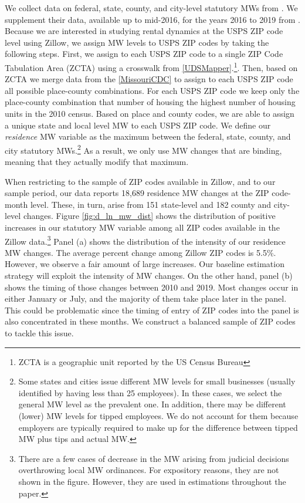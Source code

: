 We collect data on federal, state, county, and city-level statutory MWs from 
\textcite{VaghulZipperer2016}. We supplement their data, available up to mid-2016, 
for the years 2016 to 2019 from \textcite{BerkeleyLaborCenter}. 
Because we are interested in studying rental dynamics at the USPS ZIP code level using Zillow, 
we assign MW levels to USPS ZIP codes by taking the following steps. First, we assign to each USPS 
ZIP code to a single ZIP Code Tabulation Area (ZCTA) using a crosswalk from \ref{UDSMapper}.\footnote{
	ZCTA is a geographic unit reported by the US Census Bureau}. 
Then, based on ZCTA we merge data from the \ref{MissouriCDC} to assign to each USPS ZIP code 
all possible place-county combinations. For each USPS ZIP code we keep only the place-county 
combination that number of housing the highest number of housing units in the 2010 census. 
Based on place and county codes, we are able to assign a unique state and local level MW to each 
USPS ZIP code. We define our \textit{residence} MW variable as the maximum between the 
federal, state, county, and city statutory MWs.\footnote{Some states 
	and cities issue different MW levels for small businesses (usually identified by having 
	less than 25 employees). In these cases, we select the general MW level as the prevalent 
	one. In addition, there may be different (lower) MW levels for tipped employees. We do not 
	account for them because employers are typically required to make up for the difference 
	between tipped MW plus tips and actual MW.}
As a result, we only use MW changes that are binding, meaning that they actually modify 
that maximum.

When restricting to the sample of ZIP codes available in Zillow, and to our sample period, 
our data reports 18,689 residence MW changes at the ZIP code-month level. These, in turn, arise 
from 151 state-level and 182 county and city-level changes. Figure \ref{fig:d_ln_mw_dist} 
shows the distribution of positive increases in our statutory MW variable among all ZIP 
codes available in the Zillow data.\footnote{There are a few cases of decrease in the 
	MW arising from judicial decisions overthrowing local MW ordinances. For 
	expository reasons, they are not shown in the figure. However, they are 
	used in estimations throughout the paper.} %
Panel (a) shows the distribution of the intensity of our residence MW changes. The average percent 
change among Zillow ZIP codes is 5.5\%. %
However, we observe a fair amount of large increases. Our baseline estimation strategy will
exploit the intensity of MW changes. On the other hand, panel (b) shows the timing of 
those changes between 2010 and 2019. Most changes occur in either January or July, 
and the majority of them take place later in the panel. This could be problematic since
the timing of entry of ZIP codes into the panel is also concentrated in these months. We 
construct a balanced sample of ZIP codes to tackle this issue.

